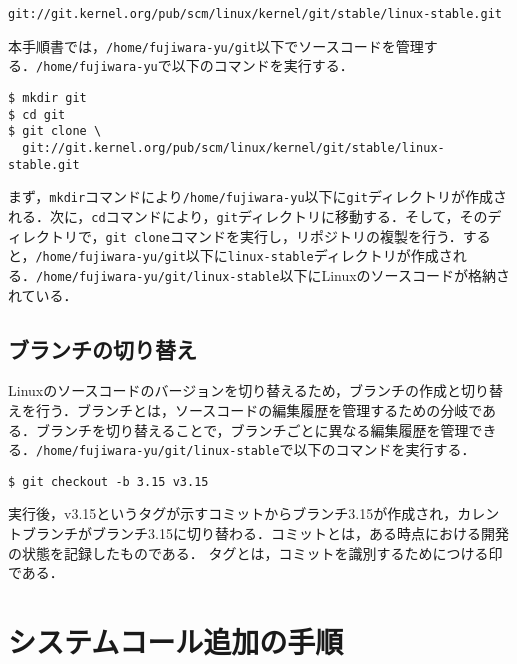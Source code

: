 \documentclass[12pt]{jsarticle}
\begin{document}
\begin{verbatim}
git://git.kernel.org/pub/scm/linux/kernel/git/stable/linux-stable.git
\end{verbatim}
本手順書では，\verb|/home/fujiwara-yu/git|以下でソースコードを管理する．\verb|/home/fujiwara-yu|で以下のコマンドを実行する．
\begin{verbatim}
$ mkdir git
$ cd git
$ git clone \
  git://git.kernel.org/pub/scm/linux/kernel/git/stable/linux-stable.git
\end{verbatim}
まず，\verb|mkdir|コマンドにより\verb|/home/fujiwara-yu|以下に\verb|git|ディレクトリが作成される．次に，\verb|cd|コマンドにより，\verb|git|ディレクトリに移動する．そして，そのディレクトリで，\verb|git clone|コマンドを実行し，リポジトリの複製を行う．すると，\verb|/home/fujiwara-yu/git|以下に\verb|linux-stable|ディレクトリが作成される．\verb|/home/fujiwara-yu/git/linux-stable|以下にLinuxのソースコードが格納されている．

\subsection{ブランチの切り替え}
Linuxのソースコードのバージョンを切り替えるため，ブランチの作成と切り替えを行う．ブランチとは，ソースコードの編集履歴を管理するための分岐である．ブランチを切り替えることで，ブランチごとに異なる編集履歴を管理できる．\verb|/home/fujiwara-yu/git/linux-stable|で以下のコマンドを実行する．
\begin{verbatim}
$ git checkout -b 3.15 v3.15
\end{verbatim}
実行後，v3.15というタグが示すコミットからブランチ3.15が作成され，カレントブランチがブランチ3.15に切り替わる．コミットとは，ある時点における開発の状態を記録したものである．
タグとは，コミットを識別するためにつける印である．

\section{システムコール追加の手順}\label{sec:procedure}
\end{document}
